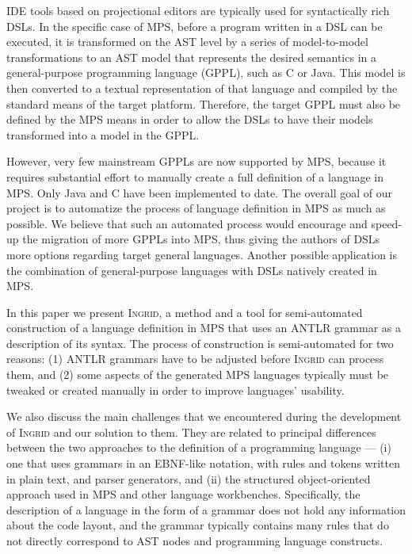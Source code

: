 IDE tools based on projectional editors are typically used for syntactically rich DSLs.
In the specific case of MPS, before a program written in a DSL can be executed, it is transformed on the AST level by a series of model-to-model transformations to an AST model that represents the desired semantics in a general-purpose programming language (GPPL), such as C or Java.
This model is then converted to a textual representation of that language and compiled by the standard means of the target platform.
Therefore, the target GPPL must also be defined by the MPS means in order to allow the DSLs to have their models transformed into a model in the GPPL.

However, very few mainstream GPPLs are now supported by MPS, because it requires substantial effort to manually create a full definition of a language in MPS.
Only Java and C have been implemented to date.
The overall goal of our project is to automatize the process of language definition in MPS as much as possible.
We believe that such an automated process would encourage and speed-up the migration of more GPPLs into MPS, thus giving the authors of DSLs more options regarding target general languages.
Another possible application is the combination of general-purpose languages with DSLs natively created in MPS.

In this paper we present \textsc{Ingrid}, a method and a tool for semi-automated construction of a language definition in MPS that uses an ANTLR grammar as a description of its syntax.
The process of construction is semi-automated for two reasons: (1) ANTLR grammars have to be adjusted before \textsc{Ingrid} can process them, and (2) some aspects of the generated MPS languages typically must be tweaked or created manually in order to improve languages' usability.

We also discuss the main challenges that we encountered during the development of \textsc{Ingrid} and our solution to them.
They are related to principal differences between the two approaches to the definition of a programming language --- (i) one that uses grammars in an EBNF-like notation, with rules and tokens written in plain text, and parser generators, and (ii) the structured object-oriented approach used in MPS and other language workbenches.
Specifically, the description of a language in the form of a grammar does not hold any information about the code layout, and the grammar typically contains many rules that do not directly correspond to AST nodes and programming language constructs.


